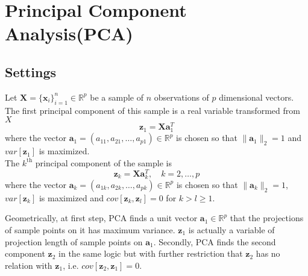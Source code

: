 \documentclass{article}
\begin{document}
    \section{Principal Component Analysis(PCA)}
        \subsection{Settings}
            Let $\mathbf{X} = \{\mathbf{x}_i\}_{i=1}^n\in\mathbb{R}^p$ be a sample of $n$ observations of $p$ dimensional vectors. The first principal component of this sample is a real variable transformed from $X$
            \[
                \mathbf{z}_1 = \mathbf{X}\mathbf{a}_1^T
            \]
            where the vector $\mathbf{a}_1=(a_{11}, a_{21},\dots,a_{p1})\in\mathbb{R}^p$ is chosen so that $\|\mathbf{a}_1\|_2=1$ and $var[\mathbf{z}_1]$ is maximized.\\
            The $k^{\mathrm{th}}$ principal component of the sample is
            \[
                \mathbf{z}_k = \mathbf{X}\mathbf{a}_k^T,\quad k=2,\dots,p
            \]
            where the vector $\mathbf{a}_k=(a_{1k},a_{2k},\dots,a_{pk})\in\mathbb{R}^p$ is chosen so that $\|\mathbf{a}_k\|_2=1$, $var[\mathbf{z}_k]$ is maximized and $cov[\mathbf{z}_k,\mathbf{z}_l]=0$ for $k>l\geq1$.
            
            Geometrically, at first step, PCA finds a unit vector $\mathbf{a}_1\in\mathbb{R}^p$ that the projections of sample points on it has maximum variance. $\mathbf{z}_1$ is actually a variable of projection length of sample points on $\mathbf{a}_1$. Secondly, PCA finds the second component $\textbf{z}_2$ in the same logic but with further restriction that $\mathbf{z}_2$ has no relation with $\mathbf{z}_1$, i.e. $cov[\mathbf{z}_2,\mathbf{z}_1]=0$.
        
\end{document}

